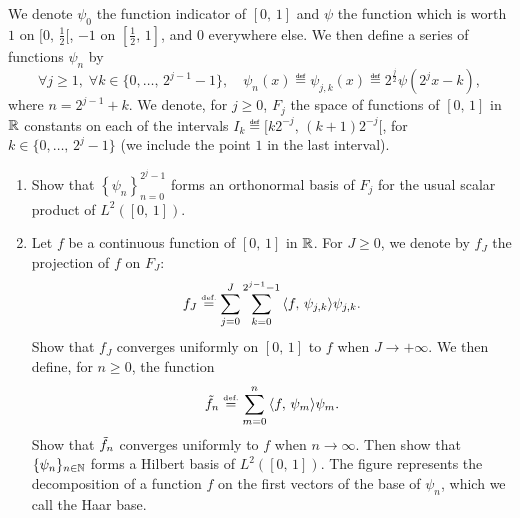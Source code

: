  
\begin{exo}
\label{exo-wavelet-haar}
 
     We denote $ \psi_0 $ the function indicator of $ [0, \, 1] $ and $ \psi $ the function which is worth $ 1 $ on $ [0, \, \frac{1}{2}[$, $ -1 $ on $ [\frac{1}{2}, \, 1] $, and $ 0 $ everywhere else. We then define a series of functions $ \psi_n $ by
\begin{equation*}
\forall j \geq 1, \; \forall k \in \{0, \ldots, \, 2^{j-1} -1\}, \quad \psi_n (x) \eqdef \psi_{j, k} (x) \eqdef 2^{\frac{j}{2}} \psi \left(2^jx - k \right),
\end{equation*}
where $ n = 2^{j-1} + k $. We denote, for $ j \geq 0 $, $ F_j $ the space of functions of $ [0, \, 1] $ in $ \mathbb{R} $ constants on each of the intervals $ I_k \eqdef [k 2^{- j }, \, (k + 1) 2^{- j}[$, for $ k \in \{0, \ldots, \, 2^j-1\} $ (we include the point $ 1 $ in the last interval). \begin{enumerate}
\item Show that $ \left\{\psi_n \right\}_{n = 0}^{2^j-1} $ forms an orthonormal basis of $ F_j $ for the usual scalar product of $ L^2 ([ 0, \, 1]) $.
\item Let $ f $ be a continuous function of $ [0, \, 1] $ in $ \mathbb{R} $. For $ J \geq 0 $, we denote by $ f_J $ the projection of $ f $ on $ F_J $:
\begin{equation*}
f_J \stackrel{\mbox{\upshape\tiny def.}}{=} \sum_{j = 0}^J{\sum_{k = 0}^{2^{j-1} -1}{\langle f,\,\psi_{j, k}\rangle \psi_{j, k}}}.
\end{equation*}
Show that $ f_J $ converges uniformly on $ [0, \, 1] $ to $ f $ when $ J \rightarrow + \infty $. We then define, for $ n \geq 0 $, the function
\begin{equation*}
\tilde{f}_n \stackrel{\mbox{\upshape\tiny def.}}{=} \sum_{m = 0}^{n}{\langle f,\,\psi_m\rangle \psi_m}.
\end{equation*}
Show that $ \tilde{f}_n $ converges uniformly to $ f $ when $ n \rightarrow \infty $. Then show that $ \{\psi_n\}_{n \in \mathbb{N}} $ forms a Hilbert basis of $ L^2 ([0, \, 1]) $. The figure  represents the decomposition of a function $ f $ on the first vectors of the base of $ \psi_n $, which we call the Haar base. \begin{figure}[ht]
    \begin{center}

\end{center}
\end{figure}
\end{enumerate}
\end{exo}
